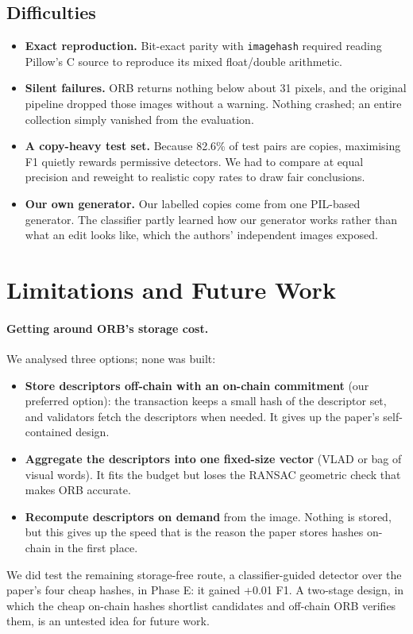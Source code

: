 \subsection{Difficulties}

\begin{itemize}
  \item \textbf{Exact reproduction.} Bit-exact parity with \texttt{imagehash} required reading
        Pillow's C source to reproduce its mixed float/double arithmetic.
  \item \textbf{Silent failures.} ORB returns nothing below about 31 pixels, and the original
        pipeline dropped those images without a warning. Nothing crashed; an entire collection
        simply vanished from the evaluation.
  \item \textbf{A copy-heavy test set.} Because 82.6\% of test pairs are copies, maximising F1
        quietly rewards permissive detectors. We had to compare at equal precision and
        reweight to realistic copy rates to draw fair conclusions.
  \item \textbf{Our own generator.} Our labelled copies come from one PIL-based generator. The
        classifier partly learned how our generator works rather than what an edit looks like,
        which the authors' independent images exposed.
\end{itemize}

\section{Limitations and Future Work}
\label{sec:future}

\paragraph{Getting around ORB's storage cost.} We analysed three options; none was built:
\begin{itemize}
  \item \textbf{Store descriptors off-chain with an on-chain commitment} (our preferred option):
        the transaction keeps a small hash of the descriptor set, and validators fetch the
        descriptors when needed. It gives up the paper's self-contained design.
  \item \textbf{Aggregate the descriptors into one fixed-size vector} (VLAD or bag of visual words).
        It fits the budget but loses the RANSAC geometric check that makes ORB accurate.
  \item \textbf{Recompute descriptors on demand} from the image. Nothing is stored, but this
        gives up the speed that is the reason the paper stores hashes on-chain in the first
        place.
\end{itemize}
We did test the remaining storage-free route, a classifier-guided detector over the paper's
four cheap hashes, in Phase E: it gained +0.01 F1. A two-stage design, in which the cheap
on-chain hashes shortlist candidates and off-chain ORB verifies them, is an untested idea for
future work.

